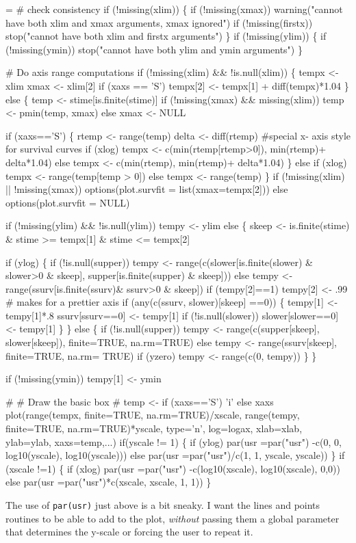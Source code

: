 \documentclass{article}
\begin{document}
\begin{nwchunk}
=
 # check consistency
 if (!missing(xlim)) \{
     if (!missing(xmax)) warning("cannot have both xlim and xmax arguments, xmax ignored")
     if (!missing(firstx)) stop("cannot have both xlim and firstx arguments")
 \}
 if (!missing(ylim)) \{
     if (!missing(ymin)) stop("cannot have both ylim and ymin arguments")
 \}
 
 # Do axis range computations
 if (!missing(xlim) && !is.null(xlim)) \{
     tempx <- xlim
     xmax <- xlim[2]
     if (xaxs == 'S') tempx[2] <- tempx[1] + diff(tempx)*1.04
 \}
 else \{
     temp <-  stime[is.finite(stime)]
     if (!missing(xmax) && missing(xlim)) temp <- pmin(temp, xmax)
     else xmax <- NULL
     
     if (xaxs=='S') \{
         rtemp <- range(temp)
         delta <- diff(rtemp)
         #special x- axis style for survival curves
         if (xlog) tempx <- c(min(rtemp[rtemp>0]), min(rtemp)+ delta*1.04)
         else tempx <- c(min(rtemp), min(rtemp)+ delta*1.04)
     \}
     else if (xlog) tempx <- range(temp[temp > 0])
     else tempx <- range(temp)
 \}  
 if (!missing(xlim) || !missing(xmax)) 
     options(plot.survfit = list(xmax=tempx[2]))
 else options(plot.survfit = NULL)
 
 if (!missing(ylim) && !is.null(ylim)) tempy <- ylim
 else \{
     skeep <- is.finite(stime) & stime >= tempx[1] & stime <= tempx[2]
 
     if (ylog) \{
         if (!is.null(supper))
             tempy <- range(c(slower[is.finite(slower) & slower>0 & skeep], 
                              supper[is.finite(supper) & skeep]))
         else tempy <-  range(ssurv[is.finite(ssurv)& ssurv>0 & skeep])
         if (tempy[2]==1) tempy[2] <- .99   # makes for a prettier axis
         if (any(c(ssurv, slower)[skeep] ==0)) \{
             tempy[1] <- tempy[1]*.8
             ssurv[ssurv==0] <- tempy[1]
             if (!is.null(slower))  slower[slower==0] <- tempy[1]
         \}
     \}
     else \{
         if (!is.null(supper)) 
             tempy <- range(c(supper[skeep], slower[skeep]), finite=TRUE, na.rm=TRUE)
         else tempy <- range(ssurv[skeep], finite=TRUE, na.rm= TRUE)
         if (yzero) tempy <- range(c(0, tempy))
     \}
 \}
 
 if (!missing(ymin)) tempy[1] <- ymin
 
 #
 # Draw the basic box
 #
 temp <- if (xaxs=='S') 'i' else xaxs
 plot(range(tempx, finite=TRUE, na.rm=TRUE)/xscale, 
      range(tempy, finite=TRUE, na.rm=TRUE)*yscale, 
      type='n', log=logax, xlab=xlab, ylab=ylab, xaxs=temp,...)
 if(yscale != 1) \{
     if (ylog) par(usr =par("usr") -c(0, 0, log10(yscale), log10(yscale))) 
     else par(usr =par("usr")/c(1, 1, yscale, yscale))   
 \}
 if (xscale !=1) \{
     if (xlog) par(usr =par("usr") -c(log10(xscale), log10(xscale), 0,0)) 
     else par(usr =par("usr")*c(xscale, xscale, 1, 1))   
 \}  
\end{nwchunk}
The use of \Verb!par(usr)! just above is a bit sneaky.  I want the
lines and points routines to be able to add to the plot, \emph{without}
passing them a global parameter that determines the y-scale or forcing
the user to repeat it.
\end{document}
